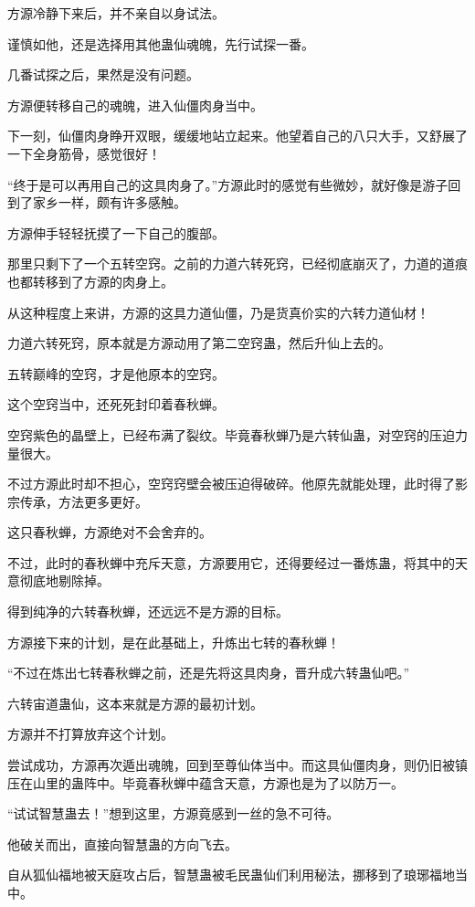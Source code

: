 \begin{this_body}
方源冷静下来后，并不亲自以身试法。

谨慎如他，还是选择用其他蛊仙魂魄，先行试探一番。

几番试探之后，果然是没有问题。

方源便转移自己的魂魄，进入仙僵肉身当中。

下一刻，仙僵肉身睁开双眼，缓缓地站立起来。他望着自己的八只大手，又舒展了一下全身筋骨，感觉很好！

“终于是可以再用自己的这具肉身了。”方源此时的感觉有些微妙，就好像是游子回到了家乡一样，颇有许多感触。

方源伸手轻轻抚摸了一下自己的腹部。

那里只剩下了一个五转空窍。之前的力道六转死窍，已经彻底崩灭了，力道的道痕也都转移到了方源的肉身上。

从这种程度上来讲，方源的这具力道仙僵，乃是货真价实的六转力道仙材！

力道六转死窍，原本就是方源动用了第二空窍蛊，然后升仙上去的。

五转巅峰的空窍，才是他原本的空窍。

这个空窍当中，还死死封印着春秋蝉。

空窍紫色的晶壁上，已经布满了裂纹。毕竟春秋蝉乃是六转仙蛊，对空窍的压迫力量很大。

不过方源此时却不担心，空窍窍壁会被压迫得破碎。他原先就能处理，此时得了影宗传承，方法更多更好。

这只春秋蝉，方源绝对不会舍弃的。

不过，此时的春秋蝉中充斥天意，方源要用它，还得要经过一番炼蛊，将其中的天意彻底地剔除掉。

得到纯净的六转春秋蝉，还远远不是方源的目标。

方源接下来的计划，是在此基础上，升炼出七转的春秋蝉！

“不过在炼出七转春秋蝉之前，还是先将这具肉身，晋升成六转蛊仙吧。”

六转宙道蛊仙，这本来就是方源的最初计划。

方源并不打算放弃这个计划。

尝试成功，方源再次遁出魂魄，回到至尊仙体当中。而这具仙僵肉身，则仍旧被镇压在山里的蛊阵中。毕竟春秋蝉中蕴含天意，方源也是为了以防万一。

“试试智慧蛊去！”想到这里，方源竟感到一丝的急不可待。

他破关而出，直接向智慧蛊的方向飞去。

自从狐仙福地被天庭攻占后，智慧蛊被毛民蛊仙们利用秘法，挪移到了琅琊福地当中。


\end{this_body}
